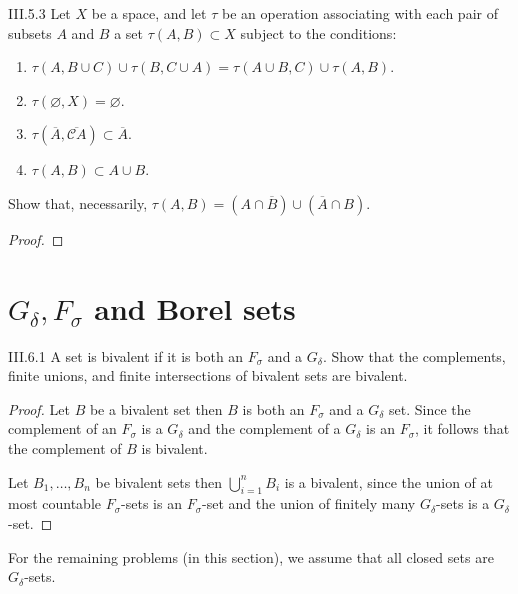 \begin{problem}{III.5.3}
Let \(X\) be a space, and let \( \tau \) be an operation associating with each pair of subsets \(A\) and \(B\) a set \(\tau(A, B) \subset X\) subject to the conditions:
\begin{enumerate}[label={\alph*.}]
	\item \( \tau(A, B \cup C) \cup \tau(B, C\cup A) = \tau(A\cup B, C) \cup \tau(A, B) \).
	\item \( \tau(\varnothing, X) = \varnothing \).
	\item \( \tau(\overline{A}, \overline{\mathscr{C}A}) \subset \overline{A} \).
	\item \( \tau(A, B) \subset A \cup B \).
\end{enumerate}

Show that, necessarily, \( \tau(A, B) = (A \cap \overline{B}) \cup (\overline{A} \cap B) \).
\end{problem}

\begin{proof}
\end{proof}

\section{\( G_{\delta}, F_{\sigma} \) and Borel sets}

\begin{problem}{III.6.1}\label{problem:III.6.1}
A set is bivalent if it is both an \(F_{\sigma}\) and a \(G_{\delta}\). Show that the complements, finite unions, and finite intersections of bivalent sets are bivalent.
\end{problem}

\begin{proof}
	Let \(B\) be a bivalent set then \(B\) is both an \(F_{\sigma}\) and a \(G_{\delta}\) set. Since the complement of an \(F_{\sigma}\) is a \(G_{\delta}\) and the complement of a \(G_{\delta}\) is an \(F_{\sigma}\), it follows that the complement of \(B\) is bivalent.

	Let \( B_{1}, \ldots, B_{n} \) be bivalent sets then \( \bigcup^{n}_{i=1}B_{i} \) is a bivalent, since the union of at most countable \(F_{\sigma}\)-sets is an \(F_{\sigma}\)-set and the union of finitely many \(G_{\delta}\)-sets is a \(G_{\delta}\)-set.
\end{proof}

For the remaining problems (in this section), we assume that all closed sets are \(G_{\delta}\)-sets.

